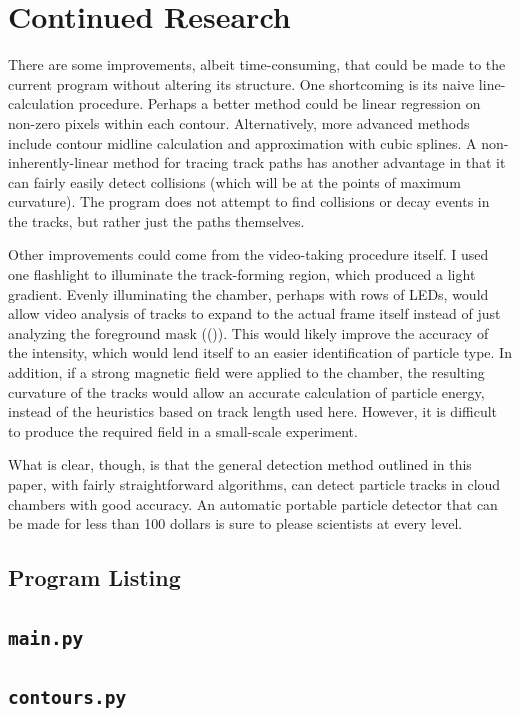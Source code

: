 \documentclass[notitlepage,12pt]{article}
\newcommand{\mycite}[1]{((\bibentry{#1}))}
\begin{document}
\section{Continued Research}

There are some improvements, albeit time-consuming, that could be made to the current program without altering its structure.  One shortcoming is its naive line-calculation procedure.  Perhaps a better method could be linear regression on non-zero pixels within each contour.  Alternatively, more advanced methods include contour midline calculation and approximation with cubic splines.  A non-inherently-linear method for tracing track paths has another advantage in that it can fairly easily detect collisions (which will be at the points of maximum curvature).  The program does not attempt to find collisions or decay events in the tracks, but rather just the paths themselves. 
 
Other improvements could come from the video-taking procedure itself.  I used one flashlight to illuminate the track-forming region, which produced a light gradient.  Evenly illuminating the chamber, perhaps with rows of LEDs, would allow video analysis of tracks to expand to the actual frame itself instead of just analyzing the foreground mask \mycite{wayne}.  This would likely improve the accuracy of the intensity, which would lend itself to an easier identification of particle type.  In addition, if a strong magnetic field were applied to the chamber, the resulting curvature of the tracks would allow an accurate calculation of particle energy, instead of the heuristics based on track length used here.   However, it is difficult to produce the required field in a small-scale experiment.

What is clear, though, is that the general detection method outlined in this paper, with fairly straightforward algorithms, can detect particle tracks in cloud chambers with good accuracy.  An automatic portable particle detector that can be made for less than 100 dollars is sure to please scientists at every level.

\begin{appendices}

\clearpage

\section{Program Listing}
\subsection{\texttt{main.py}}


\clearpage

\subsection{\texttt{contours.py}}


\clearpage

%



\end{appendices}
\end{document}
